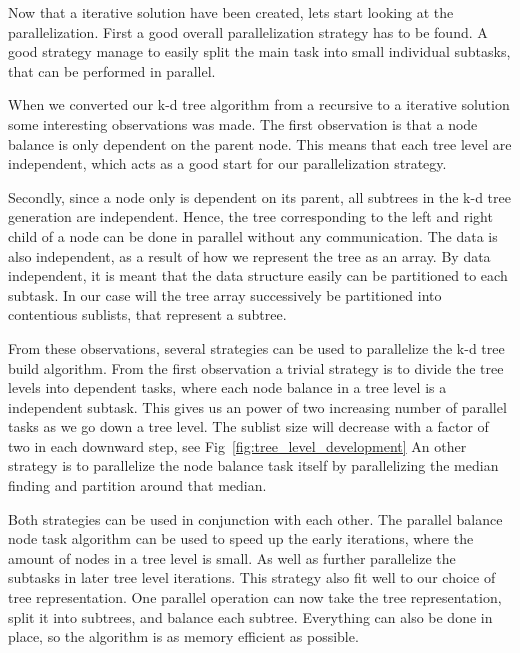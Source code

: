 Now that a iterative solution have been created, lets start looking at the parallelization. First a good overall parallelization strategy has to be found. A good strategy manage to easily split the main task into small individual subtasks, that can be performed in parallel.


When we converted our k-d tree algorithm from a recursive to a iterative solution some interesting observations was made. The first observation is that a node balance is only dependent on the parent node. This means that each tree level are independent, which acts as a good start for our parallelization strategy.

Secondly, since a node only is dependent on its parent, all subtrees in the k-d tree generation are independent. Hence, the tree corresponding to the left and right child of a node can be done in parallel without any communication. The data is also independent, as a result of how we represent the tree as an array. By data independent, it is meant that the data structure easily can be partitioned to each subtask. In our case will the tree array successively be partitioned into contentious sublists, that represent a subtree.

From these observations, several strategies can be used to parallelize the k-d tree build algorithm. From the first observation a trivial strategy is to divide the tree levels into dependent tasks, where each node balance in a tree level is a independent subtask. This gives us an power of two increasing number of parallel tasks as we go down a tree level. The sublist size will decrease with a factor of two in each downward step, see Fig~\ref{fig:tree_level_development} An other strategy is to parallelize the node balance task itself by parallelizing the median finding and partition around that median.

Both strategies can be used in conjunction with each other. The parallel balance node task algorithm can be used to speed up the early iterations, where the amount of nodes in a tree level is small. As well as further parallelize the subtasks in later tree level iterations. This strategy also fit well to our choice of tree representation. One parallel operation can now take the tree representation, split it into subtrees, and balance each subtree. Everything can also be done in place, so the algorithm is as memory efficient as possible.




